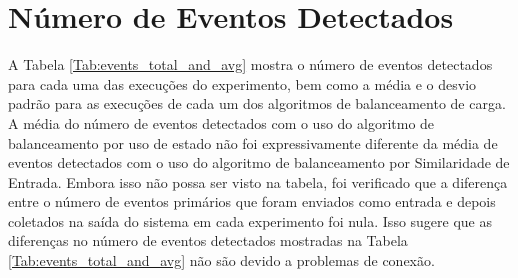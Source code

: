 \section{Número de Eventos Detectados}
\label{sec:number_of_detected_events}


A Tabela \ref{Tab:events_total_and_avg} mostra o número de eventos detectados para cada uma das execuções do experimento, bem como a média e o desvio padrão para as execuções de cada um dos algoritmos de balanceamento de carga. A média do número de eventos detectados com o uso do algoritmo de balanceamento por uso de estado não foi expressivamente diferente da média de eventos detectados com o uso do algoritmo de balanceamento por Similaridade de Entrada. %
Embora isso não possa ser visto na tabela, foi verificado que a diferença entre o número de eventos primários que foram enviados como entrada e depois coletados na saída do sistema em cada experimento foi nula. Isso sugere que as diferenças no número de eventos detectados mostradas na Tabela \ref{Tab:events_total_and_avg} não são devido a problemas de conexão. 



